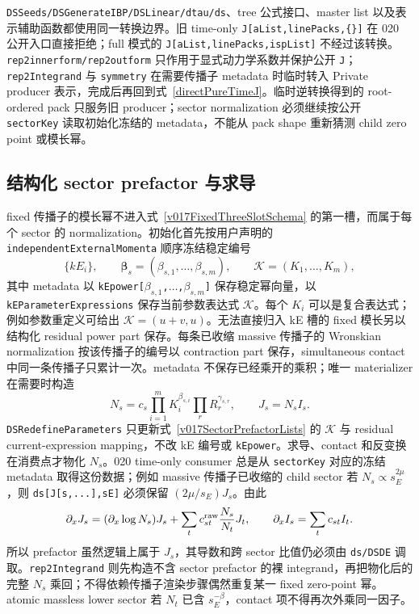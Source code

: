 ﻿\documentclass[a4paper,11pt]{article}
\begin{document}
\texttt{DSSeeds/DSGenerateIBP/DSLinear/dtau/ds}、tree 公式接口、master list 以及表示辅助函数都使用同一转换边界。旧 time-only \texttt{J[aList,linePacks,\{\}]} 在 020 公开入口直接拒绝；full 模式的 \texttt{J[aList,linePacks,ispList]} 不经过该转换。\texttt{rep2innerform/rep2outform} 只作用于显式动力学系数并保护公开 \texttt{J}；\texttt{rep2Integrand} 与 \texttt{symmetry} 在需要传播子 metadata 时临时转入 Private producer 表示，完成后再回到式~\eqref{directPureTimeJ}。临时逆转换得到的 root-ordered pack 只服务旧 producer；sector normalization 必须继续按公开 \texttt{sectorKey} 读取初始化冻结的 metadata，不能从 pack shape 重新猜测 child zero point 或模长幂。

\subsection{结构化 sector prefactor 与求导}

fixed 传播子的模长幂不进入式~\eqref{v017FixedThreeSlotSchema} 的第一槽，而属于每个 sector 的 normalization。初始化首先按用户声明的 \texttt{independentExternalMomenta} 顺序冻结稳定编号
\begin{equation}
 \{kE_i\},\qquad \boldsymbol\beta_s=(\beta_{s,1},\ldots,\beta_{s,m}),
 \qquad \mathcal K=(K_1,\ldots,K_m),
 \label{v017SectorPrefactorLists}
\end{equation}
其中 metadata 以 \texttt{kEpower[$\beta_{s,1}$,$\ldots$,$\beta_{s,m}$]} 保存稳定幂向量，以 \texttt{kEParameterExpressions} 保存当前参数表达式 $\mathcal K$。每个 $K_i$ 可以是复合表达式；例如参数重定义可给出 $\mathcal K=(u+v,u)$。无法直接归入 kE 槽的 fixed 模长另以结构化 residual power part 保存。每条已收缩 massive 传播子的 Wronskian normalization 按该传播子的编号以 contraction part 保存，simultaneous contact 中同一条传播子只累计一次。metadata 不保存已经乘开的乘积；唯一 materializer 在需要时构造
\begin{equation}
 N_s=c_s\prod_{i=1}^{m}K_i^{\beta_{s,i}}\prod_r R_r^{\gamma_{s,r}},
 \qquad J_s=N_s I_s.
 \label{v017SectorNormalization}
\end{equation}
\texttt{DSRedefineParameters} 只更新式~\eqref{v017SectorPrefactorLists} 的 $\mathcal K$ 与 residual current-expression mapping，不改 kE 编号或 \texttt{kEpower}。求导、contact 和反变换在消费点才物化 $N_s$。020 time-only consumer 总是从 \texttt{sectorKey} 对应的冻结 metadata 取得这份数据；例如 massive 传播子已收缩的 child sector 若 $N_s\propto s_E^{2\mu}$，则 \texttt{ds[J[s,...],sE]} 必须保留 $(2\mu/s_E)J_s$。由此
\begin{equation}
 \partial_xJ_s=(\partial_x\log N_s)J_s
 +\sum_t c^{\rm raw}_{st}{N_s\over N_t}J_t,
 \qquad
 \partial_xI_s=\sum_t c_{st}I_t.
 \label{v017NormalizedDerivative}
\end{equation}
所以 prefactor 虽然逻辑上属于 $J_s$，其导数和跨 sector 比值仍必须由 \texttt{ds/DSDE} 调取。\texttt{rep2Integrand} 则先构造不含 sector prefactor 的裸 integrand，再把物化后的完整 $N_s$ 乘回；不得依赖传播子渲染步骤偶然重复某一 fixed zero-point 幂。atomic massless lower sector 若 $N_t$ 已含 $s_E^{-\beta}$，contact 项不得再次外乘同一因子。
\end{document}
